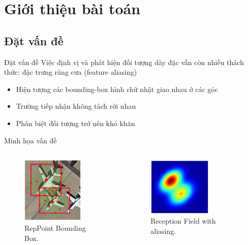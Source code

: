 \documentclass[11pt]{beamer}
\theoremstyle{definition}
\theoremstyle{plain}
\theoremstyle{plain}
\theoremstyle{remark}
\begin{document}
\section{Giới thiệu bài toán}

\subsection{Đặt vấn đề}
\begin{frame}{Đặt vấn đề}
	Việc định vị và phát hiện đối tượng dày đặc vẫn còn nhiều thách thức: đặc trưng răng cưa (feature aliasing)
	\begin{itemize}
		\item Hiện tượng các bounding-box hình chữ nhật giao nhau ở các góc
		\item Trường tiếp nhận không tách rời nhau
		\item Phân biệt đối tượng trở nên khó khăn
	\end{itemize}
\end{frame}

\begin{frame}{Minh họa vấn đề}
	\begin{columns}[c] %
		\begin{figure}
			\centering
			\includegraphics[width=3cm]{reppoint_bouding_box.jpg}
			\caption{RepPoint Bounding Box.}
		\end{figure}
		
		\begin{figure}
			\centering
			\includegraphics[width=3cm]{reception_field_w_aliasing.jpg}
			\caption{Reception Field with aliasing.}
		\end{figure}
	\end{columns}
\end{frame}
\end{document}
